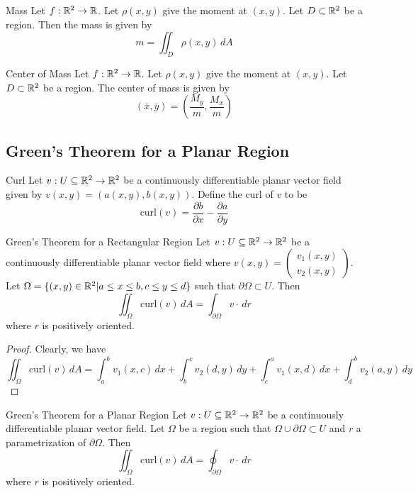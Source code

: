 \documentclass[a4paper]{article}
\begin{document}
\begin{thm}{Mass}{} Let $f:\mathbb{R}^2\to\mathbb{R}$. Let $\rho(x,y)$ give the moment at $(x,y)$. Let $D\subset\mathbb{R}^2$ be a region. Then the mass is given by $$m=\iint_D\rho(x,y)\,dA$$
\end{thm}

\begin{thm}{Center of Mass}{} Let $f:\mathbb{R}^2\to\mathbb{R}$. Let $\rho(x,y)$ give the moment at $(x,y)$. Let $D\subset\mathbb{R}^2$ be a region. The center of mass is given by $$(\overline{x},\overline{y})=\left(\frac{M_y}{m},\frac{M_x}{m}\right)$$
\end{thm}

\subsection{Green's Theorem for a Planar Region}
\begin{defn}{Curl}{} Let $v:U\subseteq\mathbb{R}^2\to\mathbb{R}^2$ be a continuously differentiable planar vector field given by $v(x,y)=\left(a(x,y),b(x,y)\right)$. Define the curl of $v$ to be $$\text{curl}(v)=\frac{\partial b}{\partial x}-\frac{\partial a}{\partial y}$$
\end{defn}

\begin{thm}{Green's Theorem for a Rectangular Region}{} Let $v:U\subseteq\mathbb{R}^2\to\mathbb{R}^2$ be a continuously differentiable planar vector field where $v(x,y)=\begin{pmatrix}v_1(x,y)\\v_2(x,y)\end{pmatrix}$. Let $\Omega=\{(x,y)\in\mathbb{R}^2|a\leq x\leq b,c\leq y\leq d\}$ such that $\partial\Omega\subset U$. Then $$\iint_\Omega\text{curl}(v)\,dA=\int_{\partial\Omega}v\cdot\,dr$$ where $r$ is positively oriented. 
\begin{proof}
Clearly, we have $$\iint_\Omega\text{curl}(v)\,dA=\int_a^bv_1(x,c)\,dx+\int_b^cv_2(d,y)\,dy+\int_c^av_1(x,d)\,dx+\int_d^bv_2(a,y)\,dy$$
\end{proof}
\end{thm}

\begin{thm}{Green's Theorem for a Planar Region}{} Let $v:U\subseteq\mathbb{R}^2\to\mathbb{R}^2$ be a continuously differentiable planar vector field. Let $\Omega$ be a region such that $\Omega\cup\partial\Omega\subset U$ and $r$ a parametrization of $\partial\Omega$. Then $$\iint_\Omega\text{curl}(v)\,dA=\oint_{\partial\Omega}v\cdot\,dr$$ where $r$ is positively oriented. 
\end{thm}
\end{document}
